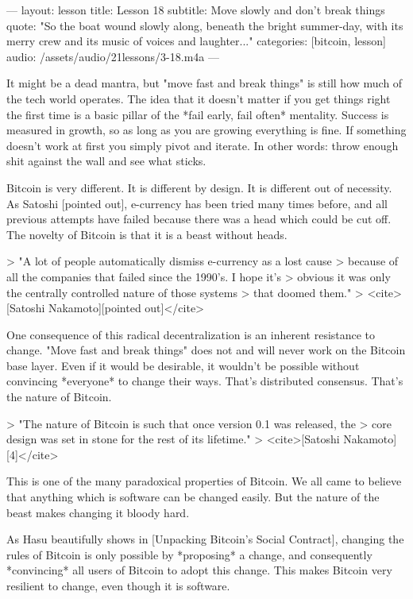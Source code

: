 ---
layout: lesson
title: Lesson 18
subtitle: Move slowly and don't break things
quote: "So the boat wound slowly along, beneath the bright summer-day, with its merry crew and its music of voices and laughter..."
categories: [bitcoin, lesson]
audio: /assets/audio/21lessons/3-18.m4a 
---

It might be a dead mantra, but "move fast and break things" is still how
much of the tech world operates. The idea that it doesn't matter if you
get things right the first time is a basic pillar of the *fail early,
fail often* mentality. Success is measured in growth, so as long as you
are growing everything is fine. If something doesn't work at first you
simply pivot and iterate. In other words: throw enough shit against the
wall and see what sticks.

Bitcoin is very different. It is different by design. It is different
out of necessity. As Satoshi [pointed out], e-currency has been tried
many times before, and all previous attempts have failed because there
was a head which could be cut off. The novelty of Bitcoin is that it is
a beast without heads.

> "A lot of people automatically dismiss e-currency as a lost cause
> because of all the companies that failed since the 1990's. I hope it's
> obvious it was only the centrally controlled nature of those systems
> that doomed them."
> <cite>[Satoshi Nakamoto][pointed out]</cite>

One consequence of this radical decentralization is an inherent
resistance to change. "Move fast and break things" does not and will
never work on the Bitcoin base layer. Even if it would be desirable, it
wouldn't be possible without convincing *everyone* to change their ways.
That's distributed consensus. That's the nature of Bitcoin.

> "The nature of Bitcoin is such that once version 0.1 was released, the
> core design was set in stone for the rest of its lifetime."
> <cite>[Satoshi Nakamoto][4]</cite>

This is one of the many paradoxical properties of Bitcoin. We all came
to believe that anything which is software can be changed easily. But
the nature of the beast makes changing it bloody hard.

As Hasu beautifully shows in [Unpacking Bitcoin's Social Contract],
changing the rules of Bitcoin is only possible by *proposing* a change,
and consequently *convincing* all users of Bitcoin to adopt this change.
This makes Bitcoin very resilient to change, even though it is software.

